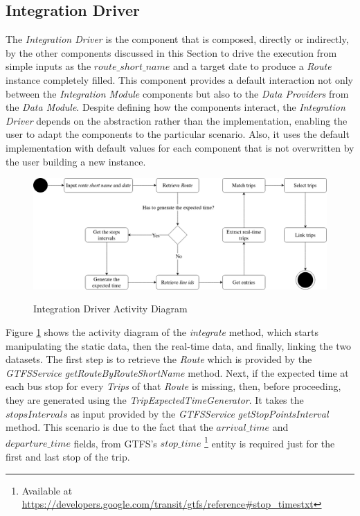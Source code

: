 
\subsection{Integration Driver}
The { \em Integration Driver} is the component that is composed, directly or indirectly, by the other components 
discussed in this Section to drive the execution from simple inputs as the $route\_short\_name$ and a target date
to produce a \textit{Route} instance completely filled. This component provides a default interaction not only 
between the \textit{Integration Module} components but also to the \textit{Data Providers} 
from the \textit{Data Module}.
Despite defining how the components interact, the { \em Integration Driver} depends on the abstraction
rather than the implementation, enabling the user to adapt the components to the particular scenario. Also,
it uses the default implementation with default values
for each component that is not overwritten by the user building a new instance.

    \begin{figure}[h]
        \centering
        \caption{Integration Driver Activity Diagram}
        \includegraphics[width=\textwidth]{imagem/cap4/integrationDriverAD.drawio.png}
        \label{img:4:integrationDriverAD}
    \end{figure}

Figure \ref{img:4:integrationDriverAD} shows the activity diagram of the \textit{integrate} method, which starts manipulating
the static data, then the real-time data, and finally, linking the two datasets. The first step
is to retrieve the \textit{Route} which is provided by the \textit{GTFSService} \textit{getRouteByRouteShortName}
method. Next, if the expected time at each bus stop for every \textit{Trips} of that
\textit{Route} is missing, then, before proceeding,
they are generated using the \textit{TripExpectedTimeGenerator}.
It takes the $stopsIntervals$ as input provided by the \textit{GTFSService} \textit{getStopPointsInterval} method. 
This scenario is due to the fact that the $arrival\_time$ and $departure\_time$ fields, from GTFS's $stop\_time$ 
\footnote{Available at \url{https://developers.google.com/transit/gtfs/reference#stop_timestxt}} entity is 
required just for the first and last stop of the trip.

